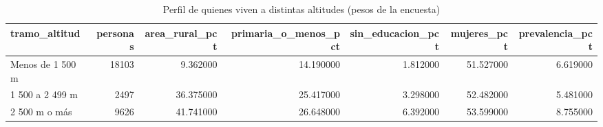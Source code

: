 \begin{table}[htbp]
\caption{Perfil de quienes viven a distintas altitudes (pesos de la encuesta)}
\label{tab:tabla_67_quien_vive_en_altura}
\begin{tabular}{lrrrrrr}
\toprule
tramo\_altitud & personas & area\_rural\_pct & primaria\_o\_menos\_pct & sin\_educacion\_pct & mujeres\_pct & prevalencia\_pct \\
\midrule
Menos de 1 500 m & 18103 & 9.362000 & 14.190000 & 1.812000 & 51.527000 & 6.619000 \\
1 500 a 2 499 m & 2497 & 36.375000 & 25.417000 & 3.298000 & 52.482000 & 5.481000 \\
2 500 m o más & 9626 & 41.741000 & 26.648000 & 6.392000 & 53.599000 & 8.755000 \\
\bottomrule
\end{tabular}
\end{table}
